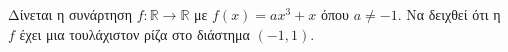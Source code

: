 Δίνεται η συνάρτηση $ f:\mathbb{R}\to\mathbb{R} $ με $ f(x)=ax^3+x $ όπου $ a\neq-1 $. Να δειχθεί ότι η $ f $ έχει μια τουλάχιστον ρίζα στο διάστημα $ (-1,1) $.
